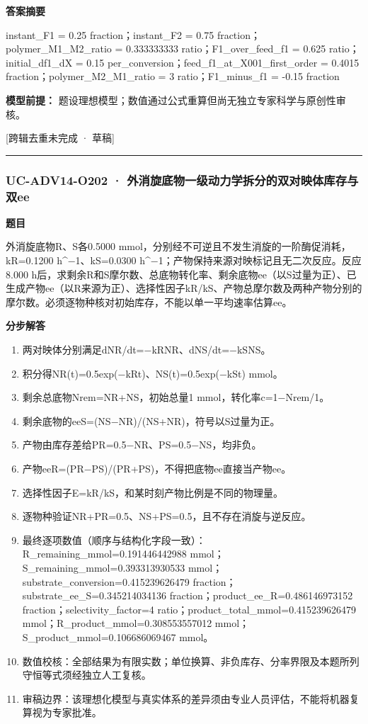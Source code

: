 \documentclass[UTF8,11pt,a4paper]{ctexart}
\begin{document}
\noindent\textbf{答案摘要}\par
instant\_F1 = 0.25 fraction；instant\_F2 = 0.75 fraction；polymer\_M1\_M2\_ratio = 0.333333333 ratio；F1\_over\_feed\_f1 = 0.625 ratio；initial\_df1\_dX = 0.15 per\_conversion；feed\_f1\_at\_X001\_first\_order = 0.4015 fraction；polymer\_M2\_M1\_ratio = 3 ratio；F1\_minus\_f1 = -0.15 fraction\par
\noindent\textbf{模型前提：}
题设理想模型；数值通过公式重算但尚无独立专家科学与原创性审核。\par
\noindent\textcolor{red!65!black}{[跨辑去重未完成 · 草稿]} \par
\medskip\hrule\medskip
{}
\subsubsection*{UC-ADV14-O202 · 外消旋底物一级动力学拆分的双对映体库存与双ee}
\noindent\textbf{题目}\par
外消旋底物R、S各0.5000 mmol，分别经不可逆且不发生消旋的一阶酶促消耗，kR=0.1200 h\textasciicircum{}−1、kS=0.0300 h\textasciicircum{}−1；产物保持来源对映标记且无二次反应。反应8.000 h后，求剩余R和S摩尔数、总底物转化率、剩余底物ee（以S过量为正）、已生成产物ee（以R来源为正）、选择性因子kR/kS、产物总摩尔数及两种产物分别的摩尔数。必须逐物种核对初始库存，不能以单一平均速率估算ee。\par
\medskip\noindent\textbf{分步解答}
\begin{enumerate}
\item 两对映体分别满足dNR/dt=−kRNR、dNS/dt=−kSNS。
\item 积分得NR(t)=0.5exp(−kRt)、NS(t)=0.5exp(−kSt) mmol。
\item 剩余总底物Nrem=NR+NS，初始总量1 mmol，转化率c=1−Nrem/1。
\item 剩余底物的eeS=(NS−NR)/(NS+NR)，符号以S过量为正。
\item 产物由库存差给PR=0.5−NR、PS=0.5−NS，均非负。
\item 产物eeR=(PR−PS)/(PR+PS)，不得把底物ee直接当产物ee。
\item 选择性因子E=kR/kS，和某时刻产物比例是不同的物理量。
\item 逐物种验证NR+PR=0.5、NS+PS=0.5，且不存在消旋与逆反应。
\item 最终逐项数值（顺序与结构化字段一致）：R\_remaining\_mmol=0.191446442988 mmol；S\_remaining\_mmol=0.393313930533 mmol；substrate\_conversion=0.415239626479 fraction；substrate\_ee\_S=0.345214034136 fraction；product\_ee\_R=0.486146973152 fraction；selectivity\_factor=4 ratio；product\_total\_mmol=0.415239626479 mmol；R\_product\_mmol=0.308553557012 mmol；S\_product\_mmol=0.106686069467 mmol。
\item 数值校核：全部结果为有限实数；单位换算、非负库存、分率界限及本题所列守恒等式须经独立人工复核。
\item 审稿边界：该理想化模型与真实体系的差异须由专业人员评估，不能将机器复算视为专家批准。
\end{enumerate}
\end{document}

